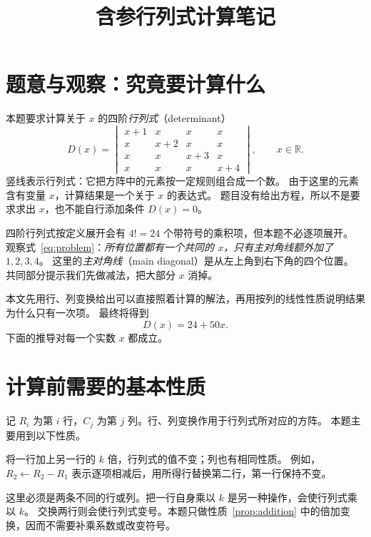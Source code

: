 \documentclass[UTF8,12pt,a4paper,fontset=fandol]{ctexart}
\title{含参行列式计算笔记}
\author{}
\date{}
\begin{document}
\maketitle

\section{题意与观察：究竟要计算什么}

本题要求计算关于 $x$ 的四阶\emph{行列式}（determinant）
\begin{equation}
  D(x)=\begin{vmatrix}
    x+1&x&x&x\\
    x&x+2&x&x\\
    x&x&x+3&x\\
    x&x&x&x+4
  \end{vmatrix},\qquad x\in\mathbb R.
  \label{eq:problem}
\end{equation}
竖线表示行列式：它把方阵中的元素按一定规则组合成一个数。
由于这里的元素含有变量 $x$，计算结果是一个关于 $x$ 的表达式。
题目没有给出方程，所以不是要求求出 $x$，也不能自行添加条件 $D(x)=0$。

四阶行列式按定义展开会有 $4!=24$ 个带符号的乘积项，但本题不必逐项展开。
观察式~\eqref{eq:problem}：\emph{所有位置都有一个共同的 $x$，只有主对角线额外加了 $1,2,3,4$}。
这里的\emph{主对角线}（main diagonal）是从左上角到右下角的四个位置。
共同部分提示我们先做减法，把大部分 $x$ 消掉。

本文先用行、列变换给出可以直接照着计算的解法，再用按列的线性性质说明结果为什么只有一次项。
最终将得到
\begin{equation}
  \boxed{D(x)=24+50x.}
  \label{eq:answer}
\end{equation}
下面的推导对每一个实数 $x$ 都成立。

\section{计算前需要的基本性质}
\label{sec:properties}

记 $R_i$ 为第 $i$ 行，$C_j$ 为第 $j$ 列。行、列变换作用于行列式所对应的方阵。
本题主要用到以下性质。

\begin{property}[倍加变换不改变行列式]
\label{prop:addition}
将一行加上另一行的 $k$ 倍，行列式的值不变；列也有相同性质。
例如，$R_2\leftarrow R_2-R_1$ 表示逐项相减后，用所得行替换第二行，第一行保持不变。
\end{property}

这里必须是两条不同的行或列。把一行自身乘以 $k$ 是另一种操作，会使行列式乘以 $k$。
交换两行则会使行列式变号。本题只做性质~\ref{prop:addition} 中的倍加变换，因而不需要补乘系数或改变符号。
\end{document}

